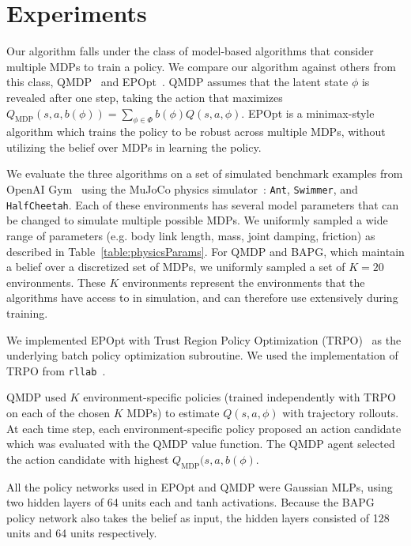 \documentclass{article}
\newcommand{\tabref}[1]{Table~\ref{#1}}%
\begin{document}
\section{Experiments}

Our algorithm falls under the class of model-based algorithms that consider multiple MDPs to train a policy.
We compare our algorithm against others from this class, QMDP~\cite{littman1995learning, karkus2017qmdp} and EPOpt~\cite{rajeswaran2016epopt}.
QMDP assumes that the latent state $\phi$ is revealed after one step, taking the action that maximizes $Q_{\text{MDP}}(s, a, b(\phi)) = \sum_{\phi \in \Phi} b(\phi) Q(s, a, \phi)$.
EPOpt is a minimax-style algorithm which trains the policy to be robust across multiple MDPs, without utilizing the belief over MDPs in learning the policy.

We evaluate the three algorithms on a set of simulated benchmark examples from OpenAI Gym~\cite{openai-gym} using the MuJoCo physics simulator~\cite{todorov2012mujoco}: \texttt{Ant}, \texttt{Swimmer}, and \texttt{HalfCheetah}.
Each of these environments has several model parameters that can be changed to simulate multiple possible MDPs.
We uniformly sampled a wide range of parameters (e.g. body link length, mass, joint damping, friction) as described in \tabref{table:physicsParams}.
For QMDP and BAPG, which maintain a belief over a discretized set of MDPs, we uniformly sampled a set of $K = 20$ environments.
These $K$ environments represent the environments that the algorithms have access to in simulation, and can therefore use extensively during training.

We implemented EPOpt with Trust Region Policy Optimization (TRPO)~\cite{trpo} as the underlying batch policy optimization subroutine.
We used the implementation of TRPO from \texttt{rllab}~\cite{duan2016benchmarking}.

QMDP used $K$ environment-specific policies (trained independently with TRPO on each of the chosen $K$ MDPs) to estimate $Q(s, a, \phi)$ with trajectory rollouts.
At each time step, each environment-specific policy proposed an action candidate which was evaluated with the QMDP value function.
The QMDP agent selected the action candidate with highest $Q_{\text{MDP}}(s, a, b(\phi)$.

All the policy networks used in EPOpt and QMDP were Gaussian MLPs, using two hidden layers of 64 units each and tanh activations.
Because the BAPG policy network also takes the belief as input, the hidden layers consisted of 128 units and 64 units respectively.
\end{document}
